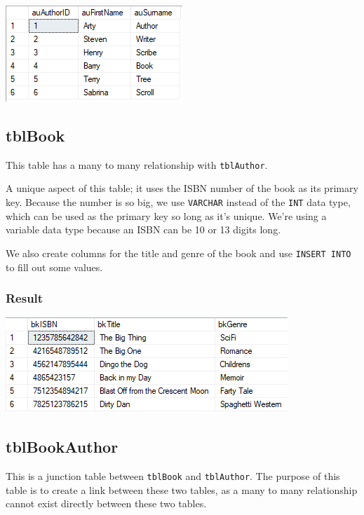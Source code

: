 \documentclass[11pt,a4paper]{scrartcl}
\begin{document}
	\begin{center}
		\includegraphics[width=0.4\linewidth]{images/Author}
	\end{center}
	
	\subsection{tblBook}\label{tblbook}
	
	This table has a many to many relationship with \texttt{tblAuthor}.
	
	
	
	A unique aspect of this table; it uses the ISBN number of the book as its primary key. Because the number is so big, we use \texttt{VARCHAR} instead of the \texttt{INT} data type, which can be used as the primary key so long as it's unique. We're using a variable data type because an ISBN can be 10 or 13 digits long.
	
	We also create columns for the title and genre of the book and use \texttt{INSERT INTO} to fill out some values.
	
	\subsubsection*{Result}
	
	\begin{center}
		\includegraphics[width=0.65\linewidth]{images/Book}
	\end{center}
	
	\subsection{tblBookAuthor}\label{tblbookauthor}
	
	This is a junction table between \texttt{tblBook} and \texttt{tblAuthor}. The purpose of this table is to create a link between these two tables, as a many to many relationship cannot exist directly between these two tables.
	
\end{document}
